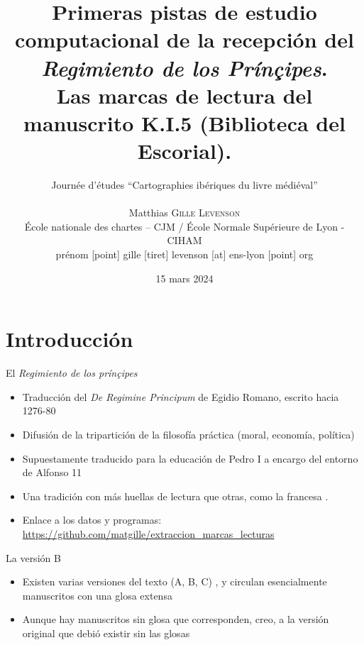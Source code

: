\documentclass[11pt,aspectratio=169]{beamer}
\date[15/03/2024]{15 mars 2024}
\author[Matthias \textsc{Gille Levenson}]{{\Large Journée d'études \enquote{Cartographies ibériques du livre médiéval}}\\~\\ Matthias \textsc{Gille Levenson}\\   {\scriptsize École nationale des chartes -- CJM / École Normale Supérieure de Lyon - CIHAM}\\ {\tiny prénom [point] gille [tiret] levenson [at] ens-lyon [point] org}\vspace{-1cm}}
\title[Las marcas de lectura del mss. K.I.5]{Primeras pistas de estudio computacional de la recepción del \textit{Regimiento de los Prínçipes}.\\ \normalsize Las marcas de lectura del manuscrito K.I.5 (Biblioteca del Escorial).}
\begin{document}
\maketitle





\begin{frame}
\tableofcontents %
\end{frame}


\section{Introducción}

\begin{frame}{El \textit{Regimiento de los prínçipes}}
\begin{center}
\begin{itemize}
\item Traducción del \textit{De Regimine Principum} de Egidio Romano, escrito hacia 1276-80
\item Difusión de la tripartición de la filosofía práctica (moral, economía, política)
\item Supuestamente traducido para la educación de Pedro I a encargo del entorno de Alfonso 11
\item Una tradición con más huellas de lectura que otras, como la francesa \parencite{perret_les_2011}.
\item Enlace a los datos y programas: 
\url{https://github.com/matgille/extraccion_marcas_lecturas}
\end{itemize}
\end{center}
\end{frame}


\begin{frame}{La versión B}
\begin{itemize}
\item Existen varias versiones del texto (A, B, C) \parencite{acero-durantez_VersionesTraduccionCastellana_2005}, y circulan esencialmente manuscritos con una glosa extensa
\item Aunque hay manuscritos sin glosa que corresponden, creo, a la versión original que debió existir sin las glosas \parencite{gillelevenson_RegimientoPrincipesSa_2023}
\end{itemize}
\end{frame}
\end{document}
